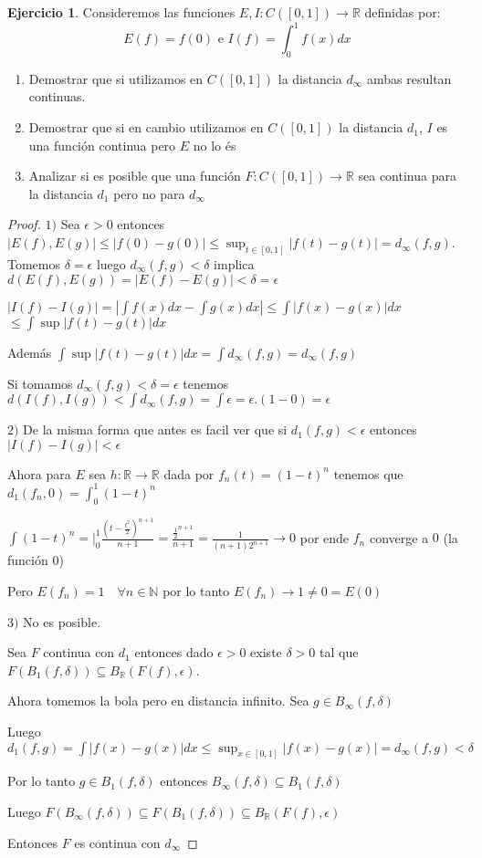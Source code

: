 \documentclass[12pt]{article}
\newcommand{\R}{\mathbb{R}}
\newcommand{\N}{\mathbb{N}}
\newcommand{\ra}{\rightarrow}
\theoremstyle{definition}
\newtheorem{ej}{Ejercicio}
\begin{document}
 \begin{ej}
   Consideremos las funciones $E,I: C([0,1]) \ra \R$ definidas por:
   $$ E(f) = f(0) \text{ e } I(f) = \int_{0}^{1}f(x)dx$$
   \begin{enumerate}
     \item Demostrar que si utilizamos en $C([0,1])$ la distancia $d_{\infty}$ ambas resultan continuas.
     \item Demostrar que si en cambio utilizamos en $C([0,1])$ la distancia $d_1$, $I$ es una función continua pero $E$ no lo és
     \item Analizar si es posible que una función $F: C([0,1]) \ra \R$ sea continua para la distancia $d_1$ pero no para $d_{\infty}$
   \end{enumerate}
   \begin{proof}
   $1)$ Sea $\epsilon > 0$ entonces $|E(f),E(g)| \leq |f(0) - g(0)| \leq \sup_{t \in [0,1]}{|f(t) - g(t)|} = d_{\infty}(f,g)$. Tomemos $\delta = \epsilon$ luego $d_{\infty}(f,g) < \delta$ implica $d(E(f),E(g)) = |E(f) - E(g)| < \delta = \epsilon$

   $|I(f) - I(g)|  = |\int f(x)dx - \int g(x)dx| \leq \int |f(x) - g(x)|dx $ $\leq \int \sup{|f(t) - g(t)|dx}$

   Además $\int \sup{|f(t) - g(t)|dx} = \int d_{\infty}(f,g) = d_{\infty}(f,g)$

   Si tomamos $d_{\infty}(f,g) < \delta = \epsilon$ tenemos $d(I(f),I(g)) < \int d_{\infty}(f,g) = \int \epsilon = \epsilon.(1-0) = \epsilon$

 \noindent $2)$ De la misma forma que antes es facil ver que si $d_1(f,g) < \epsilon$ entonces $|I(f) - I(g)| < \epsilon$

 Ahora para $E$ sea $h: \R \ra \R$ dada por $f_n(t) = (1-t)^n$ tenemos que $d_1(f_n,0) = \int_{0}^1 (1-t)^n$

 $\int (1-t)^n = \biggl |_{0}^{1} \frac{(t -\frac{t^2}{2})^{n+1}}{n+1} = \frac{\frac{1}{2}^{n+1}}{n+1} = \frac{1}{(n+1)2^{n+1}} \ra 0$ por ende $f_n$ converge a $0$ (la función $0$)

 Pero $E(f_n) = 1 \quad \forall n \in \N$ por lo tanto $E(f_n) \ra 1 \neq 0 = E(0)$

 \noindent $3)$ No es posible. 

 Sea $F$ continua con $d_1$ entonces dado $\epsilon >0$ existe $\delta >0$ tal que $F(B_1(f,\delta)) \subseteq B_{\R}(F(f),\epsilon)$. 

 Ahora tomemos la bola pero en distancia infinito. Sea $ g \in B_{\infty}(f,\delta)$

 Luego $d_1(f,g) = \int |f(x)-g(x)|dx \leq \sup_{x \in [0,1]} |f(x) - g(x)| = d_{\infty}(f,g) < \delta$

 Por lo tanto $g \in B_1(f,\delta)$ entonces $B_{\infty}(f,\delta) \subseteq B_1(f,\delta)$ 

 Luego $F(B_{\infty}(f,\delta)) \subseteq F(B_1(f,\delta)) \subseteq B_{\R}(F(f),\epsilon)$

 Entonces $F$ es continua con $d_{\infty}$
   \end{proof}
 \end{ej}
  
\end{document}
